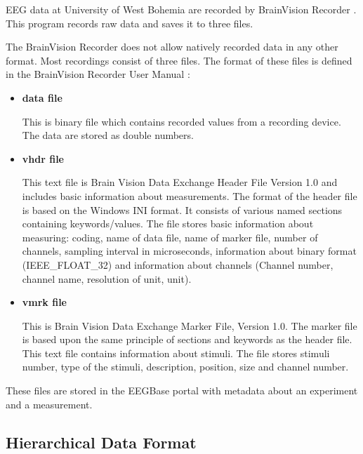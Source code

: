 \documentclass[conference]{IEEEtran}
\begin{document}
EEG data at University of West Bohemia are recorded by BrainVision Recorder \cite{brainvision}. This program records raw data and saves it to three files.

The BrainVision Recorder does not allow natively recorded data in any other format. Most recordings consist of three files. The format of these files is defined in the BrainVision Recorder User Manual \cite{brainUserManual}:
\begin{itemize}
	\item \textbf{data file}
	\label{eeg}
	
	This is binary file which contains recorded values from a recording device. The data are stored as double numbers.
	
	\item \textbf{vhdr file}
	\label{vhdr}
	
	This text file is Brain Vision Data Exchange Header File Version 1.0 and includes basic information about measurements. The format of the header file is based on the Windows INI format. It consists of various named sections containing keywords/values. The file stores basic information about measuring: coding, name of data file, name of marker file, number of channels, sampling interval in microseconds, information about binary format (IEEE\_FLOAT\_32) and information about channels (Channel number, channel name, resolution of unit, unit).
	
	\item \textbf{vmrk file}
	\label{vmrk}
	
	This is Brain Vision Data Exchange Marker File, Version 1.0. The marker file is based upon the same principle of sections and keywords as the header file. This text file contains information about stimuli. The file stores stimuli number, type of the stimuli, description, position, size and channel number.
	
\end{itemize}

These files are stored in the EEGBase portal \cite{eegportal} with metadata about an experiment and a measurement.

\subsection{Hierarchical Data Format}
\end{document}
